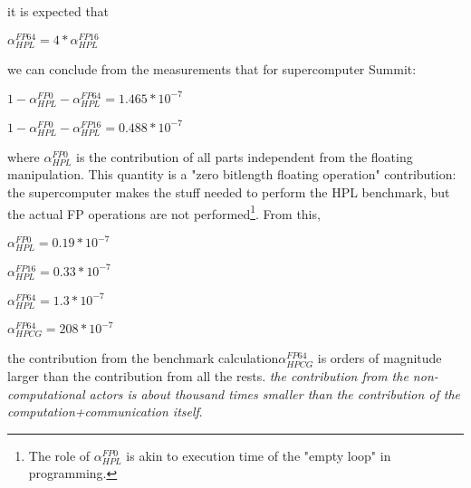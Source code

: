 {

 it is expected that

$\alpha_{HPL}^{FP64} = 4*\alpha_{HPL}^{FP16}$

we can conclude from the measurements
that for supercomputer Summit:

$1-\alpha_{HPL}^{FP0}-\alpha_{HPL}^{FP64} = 1.465*10^{-7}$

$1-\alpha_{HPL}^{FP0}-\alpha_{HPL}^{FP16} = 0.488*10^{-7}$


where $\alpha_{HPL}^{FP0}$ is the contribution of all parts independent from the floating manipulation. This quantity is a "zero bitlength floating operation" contribution: the supercomputer makes the stuff needed to perform the \gls{HPL} benchmark,
but the actual FP operations are not performed\footnote{The role of $\alpha_{HPL}^{FP0}$ is akin to execution time of the "empty loop" in programming.}.  From this, 

$\alpha_{HPL}^{FP0} =0.19*10^{-7}$

$\alpha_{HPL}^{FP16} = 0.33*10^{-7}$

$\alpha_{HPL}^{FP64} = 1.3*10^{-7}$

$\alpha_{HPCG}^{FP64} = 208*10^{-7}$

the contribution from the benchmark calculation$\alpha_{HPCG}^{FP64}$
is orders of magnitude larger than the contribution from all the rests.
\textit{the contribution from the non-computational actors is
about thousand times smaller than the contribution of
the computation+communication itself}.	
}


